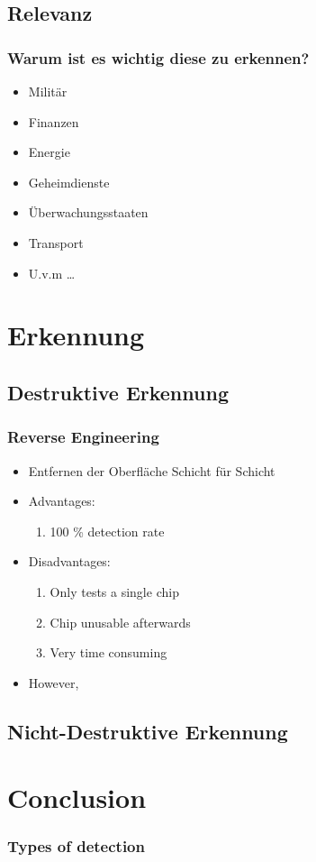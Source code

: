 \documentclass[11pt]{beamer}
\begin{document}
\subsection{Relevanz}
\begin{frame}
    \frametitle{Warum ist es wichtig diese zu erkennen?}
    \begin{itemize}
    \item Militär
    \item Finanzen
    \item Energie
    \item Geheimdienste
    \item Überwachungsstaaten
    \item Transport
    \item U.v.m \ldots
    \end{itemize}

\end{frame}


\section{Erkennung}
\subsection{Destruktive Erkennung}
\begin{frame}
    \frametitle{Reverse Engineering}
    \begin{itemize}
        \item Entfernen der Oberfläche Schicht für Schicht
        \item Advantages: 
        \begin{enumerate}
            \item 100 \% detection rate
        \end{enumerate}
        \item Disadvantages:
        \begin{enumerate}
            \item Only tests a single chip
            \item Chip unusable afterwards
            \item Very time consuming
        \end{enumerate}
        \item However, 
    \end{itemize}
\end{frame}
\subsection{Nicht-Destruktive Erkennung}
\section{Conclusion}
\begin{frame}
    \frametitle{Types of detection}
\end{frame}
\end{document}
